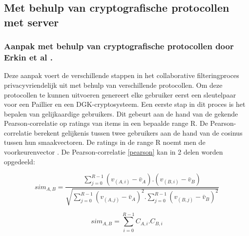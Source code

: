
\subsection{Met behulp van cryptografische protocollen met server}
\subsubsection{Aanpak met behulp van cryptografische protocollen door Erkin et al \cite{ErkinBVL11}.}
\label{cryptoprotocollen}
Deze aanpak voert de verschillende stappen in het collaborative filteringproces privacyvriendelijk uit met behulp van verschillende protocollen. Om deze protocollen te kunnen uitvoeren genereert elke gebruiker eerst een sleutelpaar voor een Paillier en een DGK-cryptosysteem. Een eerste stap in dit proces is het bepalen van gelijkaardige gebruikers. Dit gebeurt aan de hand van de gekende Pearson-correlatie op ratings van items in een bepaalde range R. De Pearson-correlatie berekent gelijkenis tussen twee gebruikers aan de hand van de cosinus tussen hun smaakvectoren. De ratings in de range R noemt men de voorkeurenvector . De Pearson-correlatie \eqref{pearson} kan in 2 delen worden opgedeeld\cite{erkin:generating}:

\begin{equation}\label{pearson}sim_{A,B} = \frac{\sum_{j=0}^{R-1}(v_{(A,i)} - \bar{v}_A).(v_{(B,i)} - \bar{v}_B)}{\sqrt{\sum_{j=0}^{R-1} (v_{(A,j)} - \bar{v}_A)^2.\sum_{j=0}^{R-1} (v_{(B,j)} - \bar{v}_B)^2}} 
\end{equation}

\begin{equation}\label{similarity}sim_{A,B} = \sum_{i=0}^{R-1} C_{A,i}.C_{B,i} \end{equation}

